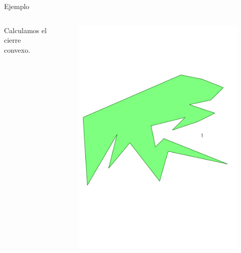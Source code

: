 \documentclass[aspectratio=169,xcolor=dvipsnames, t]{beamer}
\begin{document}
\begin{frame}{Ejemplo}
  \begin{columns}
    \begin{column}{0.3\textwidth}
      \raggedright %
      Calculamos el cierre convexo.
    \end{column}
    \begin{column}{0.7\textwidth}
      \vspace{-1.5cm} %
      \begin{figure}
        \centering
        \includegraphics[width=1\linewidth, height=.85\textheight, page=2, keepaspectratio]{IPE/point_visibility.pdf}
      \end{figure}
    \end{column}
  \end{columns}
\end{frame}
\end{document}
